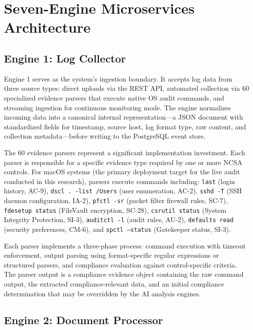\documentclass[12pt,oneside]{report}
\begin{document}
\section{Seven-Engine Microservices Architecture}

\subsection{Engine 1: Log Collector}

Engine 1 serves as the system's ingestion boundary. It accepts log data from three source types: direct uploads via the REST API, automated collection via 60 specialized evidence parsers that execute native OS audit commands, and streaming ingestion for continuous monitoring mode. The engine normalizes incoming data into a canonical internal representation—a JSON document with standardized fields for timestamp, source host, log format type, raw content, and collection metadata—before writing to the PostgreSQL event store.

The 60 evidence parsers represent a significant implementation investment. Each parser is responsible for a specific evidence type required by one or more NCSA controls. For macOS systems (the primary deployment target for the live audit conducted in this research), parsers execute commands including: \texttt{last} (login history, AC-9), \texttt{dscl . -list /Users} (user enumeration, AC-2), \texttt{sshd -T} (SSH daemon configuration, IA-2), \texttt{pfctl -sr} (packet filter firewall rules, SC-7), \texttt{fdesetup status} (FileVault encryption, SC-28), \texttt{csrutil status} (System Integrity Protection, SI-3), \texttt{auditctl -l} (audit rules, AU-2), \texttt{defaults read} (security preferences, CM-6), and \texttt{spctl --status} (Gatekeeper status, SI-3).

Each parser implements a three-phase process: command execution with timeout enforcement, output parsing using format-specific regular expressions or structured parsers, and compliance evaluation against control-specific criteria. The parser output is a compliance evidence object containing the raw command output, the extracted compliance-relevant data, and an initial compliance determination that may be overridden by the AI analysis engines.

\subsection{Engine 2: Document Processor}
\end{document}
